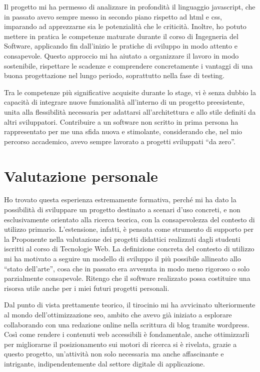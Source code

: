 \vspace{10pt}
\par\noindent Il progetto mi ha permesso di analizzare in profondità il linguaggio \gls{javascript}, che in passato avevo sempre messo in secondo piano rispetto ad \gls{html} e \gls{css}, imparando ad apprezzarne sia le potenzialità che le criticità. Inoltre, ho potuto mettere in pratica le competenze maturate durante il corso di Ingegneria del Software, applicando fin dall’inizio le pratiche di sviluppo in modo attento e consapevole. Questo approccio mi ha aiutato a organizzare il lavoro in modo sostenibile, rispettare le scadenze e comprendere concretamente i vantaggi di una buona progettazione nel lungo periodo, soprattutto nella fase di testing.

\vspace{10pt}
\par\noindent Tra le competenze più significative acquisite durante lo stage, vi è senza dubbio la capacità di integrare nuove funzionalità all’interno di un progetto preesistente, unita alla flessibilità necessaria per adattarsi all’architettura e allo stile definiti da altri sviluppatori. Contribuire a un software non scritto in prima persona ha rappresentato per me una sfida nuova e stimolante, considerando che, nel mio percorso accademico, avevo sempre lavorato a progetti sviluppati “da zero”.

\section{Valutazione personale}

\par Ho trovato questa esperienza estremamente formativa, perché mi ha dato la possibilità di sviluppare un progetto destinato a scenari d’uso concreti, e non esclusivamente orientato alla ricerca teorica, con la consapevolezza del contesto di utilizzo primario. L’estensione, infatti, è pensata come strumento di supporto per la Proponente nella valutazione dei progetti didattici realizzati dagli studenti iscritti al corso di Tecnologie Web. La definizione concreta del contesto di utilizzo mi ha motivato a seguire un modello di sviluppo il più possibile allineato allo “stato dell’arte”, cosa che in passato era avvenuta in modo meno rigoroso o solo parzialmente consapevole. Ritengo che il software realizzato possa costituire una risorsa utile anche per i miei futuri progetti personali.

\vspace{10pt}
\par\noindent Dal punto di vista prettamente teorico, il tirocinio mi ha avvicinato ulteriormente al mondo dell’ottimizzazione \gls{seo}, ambito che avevo già iniziato a esplorare collaborando con una redazione online nella scrittura di blog tramite \gls{wordpress}. Così come rendere i contenuti web accessibili è fondamentale, anche ottimizzarli per migliorarne il posizionamento sui motori di ricerca si è rivelata, grazie a questo progetto, un’attività non solo necessaria ma anche affascinante e intrigante, indipendentemente dal settore digitale di applicazione.
